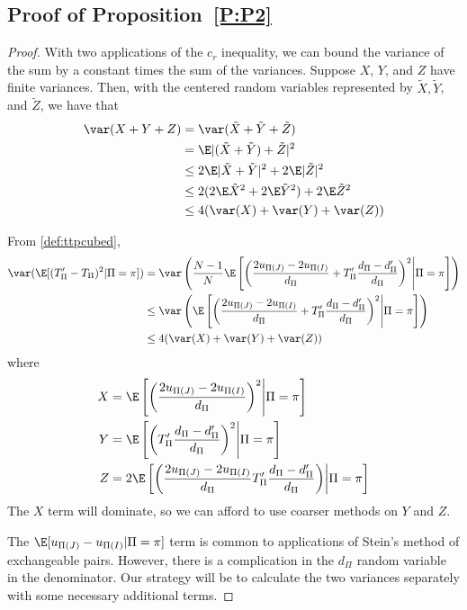 \subsection{Proof of Proposition~\ref{P:P2}}
\begin{proof}
  With two applications of the $c_r$ inequality, we can bound the variance of the sum by a constant
times the sum of the variances.  Suppose $X$, $Y$, and $Z$ have finite variances.  Then, with the
centered random variables represented by $\tilde{X}, \tilde{Y}$, and $\tilde{Z}$, we have that
  \begin{align*}
    \var(X + Y + Z)
    &= \var(\tilde{X}+\tilde{Y}+\tilde{Z}) \\
    &= \E|(\tilde{X}+\tilde{Y})+\tilde{Z}|^2 \\
    &\leq 2 \E |\tilde{X}+\tilde{Y}|^2 + 2\E |\tilde{Z}|^2 \\
    &\leq 2(2\E \tilde{X}^2 + 2\E \tilde{Y}^2) + 2\E \tilde{Z}^2 \\
    &\leq 4(\var(X) + \var(Y) + \var(Z))
  \end{align*}

  From \eqref{def:ttpcubed},
  \begin{align*}
    \var (\E[(T_{\Pi}'-T_{\Pi})^2 | \Pi = \pi]) &= \var \left ( \frac{N-1}{N}\E \left [
      \left ( \frac{2u_{\Pi(J)}-2u_{\Pi(I)}}{d_{\Pi}}+T_{\Pi}'\frac{d_{\Pi}-d_{\Pi}'}{d_{\Pi}} \right )^2
        \middle | \Pi = \pi \right ] \right ) \\
    &\leq \var \left ( \E \left [
      \left ( \frac{2u_{\Pi(J)}-2u_{\Pi(I)}}{d_{\Pi}}+T_{\Pi}'\frac{d_{\Pi}-d_{\Pi}'}{d_{\Pi}} \right )^2
        \middle | \Pi = \pi \right ] \right ) \\
    &\leq 4(\var(X) + \var(Y) + \var(Z))
  \end{align*}
  where
  \begin{align*}
    X &= \E \left [ \left ( \frac{2u_{\Pi(J)}-2u_{\Pi(I)}}{d_{\Pi}} \right )^2
        \middle | \Pi = \pi \right ] \\
    Y &= \E \left [ \left
          ( T_{\Pi}'\frac{d_{\Pi}-d_{\Pi}'}{d_{\Pi}} \right )^2 \middle | \Pi = \pi \right ] \\
    Z &= 2 \E \left [ \left ( \frac{2u_{\Pi(J)}-2u_{\Pi(I)}}{d_{\Pi}}
         T_{\Pi}'\frac{d_{\Pi}-d_{\Pi}'}{d_{\Pi}} \right ) \middle | \Pi = \pi \right ]
  \end{align*}
  The $X$ term will dominate, so we can afford to use coarser methods on $Y$ and $Z$.

  The $\E[u_{\Pi(J)}-u_{\Pi(I)} | \Pi = \pi]$ term is common to applications of Stein's method of
  exchangeable pairs.  However, there is a complication in the $d_{\Pi}$ random variable in the
  denominator.  Our strategy will be to calculate the two variances separately with some necessary
  additional terms.


\end{proof}
